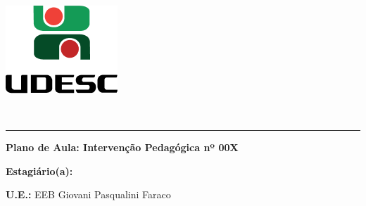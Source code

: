 \documentclass[
12pt,				%
openright,			%
oneside,			%
a4paper,			%
chapter=TITLE,		%
english,			%
brazil				%
]{abntex2}
\begin{document}
\thispagestyle{empty}
\begin{center}
	\begin{minipage}[!]{\linewidth}
		\begin{minipage}[!]{.19\linewidth}
			\includegraphics[width=\linewidth]{img/logo.png}           
		\end{minipage}
		\begin{minipage}[!]{.8\linewidth}
			\center
			\ABNTEXchapterfont\normalsize\MakeUppercase{\imprimirinstituicao}
			\par
			\vspace*{10pt}                     
			\ABNTEXchapterfont\normalsize\MakeUppercase{\centro}
			\par
			\vspace*{10pt}           
			\ABNTEXchapterfont\normalsize\MakeUppercase{\disciplina}
		\end{minipage}        
	\end{minipage}
	\\ \vspace{0.5cm}
	\rule{\textwidth}{.5pt}   
\end{center}
\textual
\begin{center}
	\textbf{Plano de Aula: Intervenção Pedagógica nº 00X}
\end{center}
\par\noindent\textbf{Estagiário(a):} \imprimirautor
\par\noindent\textbf{U.E.:} EEB Giovani Pasqualini Faraco
\end{document}
